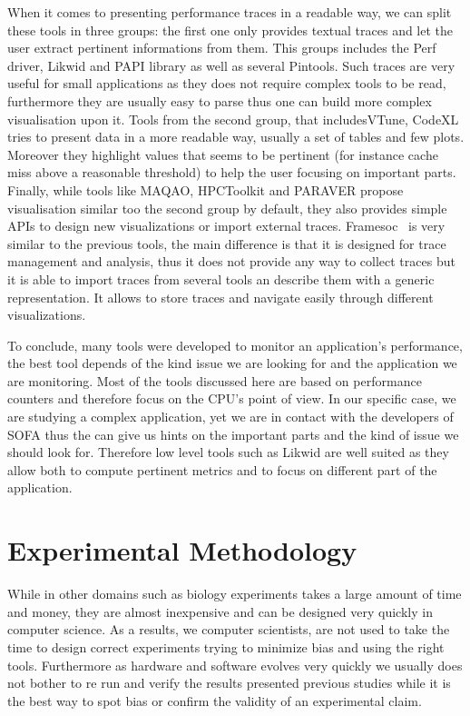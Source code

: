 When it comes to presenting performance traces in a readable way, we can split
these tools in three groups: the first one only provides textual traces and
let the user extract pertinent informations from them. This groups includes
the \gls{Perf} driver, \gls{Likwid} and \gls{PAPI} library as well as several
\glspl{Pintool}. Such traces are very useful for small applications as they
does not require complex tools to be read, furthermore they are usually easy
to parse thus one can build more complex visualisation upon it. Tools from the
second group, that includes\gls{VTune}, \gls{CodeXL} tries to present data in
a more readable way, usually a set of tables and few plots. Moreover they
highlight values that seems to be pertinent (for instance cache miss above a
reasonable threshold) to help the user focusing on important parts. Finally,
while tools like \gls{MAQAO}, \gls{HPCToolkit} and \gls{PARAVER} propose
visualisation similar too the second group by default, they also provides
simple \glspl{API} to design new visualizations or import external traces.
\gls{Framesoc}~\cite{Pagano13Trace} is very similar to the previous tools, the
main difference is that it is designed for trace management and analysis, thus
it does not provide any way to collect traces but it is able to import traces
from several tools an describe them with a generic representation. It allows
to store traces and navigate easily through different visualizations.

To conclude, many tools were developed to monitor an application's
performance, the best tool depends of the kind issue we are looking for and
the application we are monitoring. Most of the tools discussed here are based
on performance counters and therefore focus on the \gls{CPU}'s point of view.
In our specific case, we are studying a complex application, yet we are in
contact with the developers of \gls{SOFA} thus the can give us hints on the
important parts and the kind of issue we should look for. Therefore low level
tools such as \gls{Likwid} are well suited as they allow both to compute
pertinent metrics and to focus on different part of the application.

\section{Experimental Methodology}
\label{sec:expe-methodo}

While in other domains such as biology experiments takes a large amount of
time and money, they are almost inexpensive and can be designed very quickly
in computer science. As a results, we computer scientists, are not used to
take the time to design correct experiments trying to minimize bias and using
the right tools. Furthermore as hardware and software evolves very quickly we
usually does not bother to re run and verify the results presented previous
studies while it is the best way to spot bias or confirm the validity of an
experimental claim.

